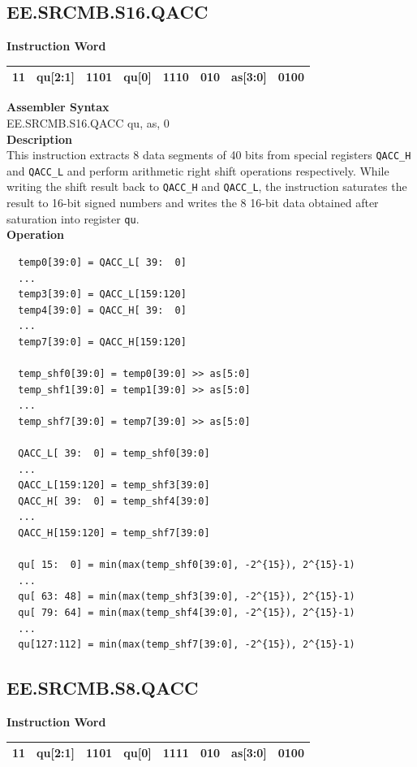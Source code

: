 \clearpage
\subsection{EE.SRCMB.S16.QACC}\label{instruction:EESRCMBS16QACC}
\setlength\tabcolsep{6pt}
\textbf{Instruction Word} \\
\begin{tabular}{|c|c|c|c|c|c|c|c|}
	\hline
	11 & qu[2:1] & 1101 & qu[0] & 1110 & 010 & as[3:0] & 0100 \\
	\hline
\end{tabular}

\textbf{Assembler Syntax} \\
EE.SRCMB.S16.QACC qu, as, 0 \\
\textbf{Description} \\
This instruction extracts 8 data segments of 40 bits from special registers \lstinline{QACC_H} and \lstinline{QACC_L} and perform arithmetic right shift operations respectively. While writing the shift result back to \lstinline{QACC_H} and \lstinline{QACC_L}, the instruction saturates the result to 16-bit signed numbers and writes the 8 16-bit data obtained after saturation into register \lstinline{qu}.\\
\textbf{Operation}
\begin{lstlisting}
  temp0[39:0] = QACC_L[ 39:  0]
  ...
  temp3[39:0] = QACC_L[159:120]
  temp4[39:0] = QACC_H[ 39:  0]
  ...
  temp7[39:0] = QACC_H[159:120]

  temp_shf0[39:0] = temp0[39:0] >> as[5:0]
  temp_shf1[39:0] = temp1[39:0] >> as[5:0]
  ...
  temp_shf7[39:0] = temp7[39:0] >> as[5:0]

  QACC_L[ 39:  0] = temp_shf0[39:0]
  ...
  QACC_L[159:120] = temp_shf3[39:0]
  QACC_H[ 39:  0] = temp_shf4[39:0]
  ...
  QACC_H[159:120] = temp_shf7[39:0]

  qu[ 15:  0] = min(max(temp_shf0[39:0], -2^{15}), 2^{15}-1)
  ...
  qu[ 63: 48] = min(max(temp_shf3[39:0], -2^{15}), 2^{15}-1)
  qu[ 79: 64] = min(max(temp_shf4[39:0], -2^{15}), 2^{15}-1)
  ...
  qu[127:112] = min(max(temp_shf7[39:0], -2^{15}), 2^{15}-1)
\end{lstlisting}

\clearpage
\subsection{EE.SRCMB.S8.QACC}\label{instruction:EESRCMBS8QACC}
\setlength\tabcolsep{6pt}
\textbf{Instruction Word} \\
\begin{tabular}{|c|c|c|c|c|c|c|c|}
	\hline
	11 & qu[2:1] & 1101 & qu[0] & 1111 & 010 & as[3:0] & 0100 \\
	\hline
\end{tabular}

